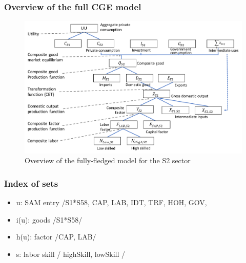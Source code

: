 \subsubsection{Overview of the full CGE model}

\begin{figure}[!ht]
	\centering
	\includegraphics[width=14cm]{figures/overview_full.pdf}
	\caption{Overview of the fully-fledged model for the S2 sector}
	\label{fig:overview_full}
\end{figure}

\subsubsection{Index of sets}
\begin{itemize}
	\item u: SAM entry     /S1*S58, CAP, LAB, IDT, TRF, HOH, GOV,
	\item i(u): goods         /S1*S58/
	\item h(u): factor        /CAP, LAB/
	\item s: labor skill   / highSkill, lowSkill /
\end{itemize}

